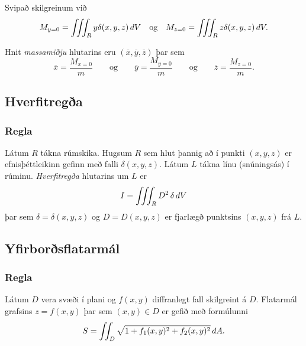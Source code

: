 Svipað skilgreinum við
 $$M_{y=0}=\thrint_R y\delta(x,y,z)\,dV \quad \text{og}\quad M_{z=0}=\thrint_R z\delta(x,y,z)\,dV.$$

Hnit {\em massamiðju} hlutarins eru $(\overline{x}, \overline{y}, \overline{z})$ þar sem 
$$\overline{x}=\frac{M_{x=0}}{m}
\qquad\mbox{og}\qquad
\overline{y}=\frac{M_{y=0}}{m}
\qquad\mbox{og}\qquad
\overline{z}=\frac{M_{z=0}}{m}.$$





\subsection{Hverfitregða} 

\subsubsection{Regla }
 Látum $R$ tákna rúmskika.  Hugsum $R$ sem hlut þannig að í punkti $(x,y,z)$ er efnisþéttleikinn gefinn með falli $\delta(x,y,z)$.  Látum $L$ tákna línu (snúningsás) í rúminu. {\em Hverfitregða} hlutarins um $L$ er
$$I=\int\!\!\!\int\!\!\!\int_R D^2 \,\delta\,dV$$
þar sem $\delta=\delta(x,y,z)$ og $D=D(x,y,z)$ er fjarlægð punktsins $(x,y,z)$ frá $L$.





\subsection{Yfirborðsflatarmál} 

\subsubsection{Regla }
 Látum $D$ vera svæði í plani og $f(x,y)$ diffranlegt fall skilgreint á $D$.  Flatarmál grafsins $z=f(x,y)$ þar sem $(x,y)\in D$ er gefið með formúlunni
$$S=\int\!\!\!\int_D \sqrt{1+f_1(x,y)^2+f_2(x,y)^2}\,dA.$$






